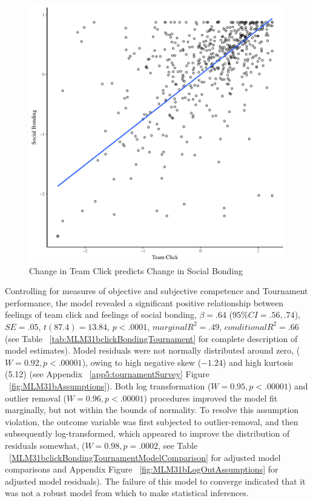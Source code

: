 \begin{landscape}
        \begin{figure}[htbp]
        \includegraphics[width = \linewidth]{images/clickBondOverallBasicXY.pdf}
          \caption{Change in Team Click predicts Change in Social Bonding}
          \label{fig:clickBondOverallBasicXY}
        \end{figure}

   Controlling for measures of objective and subjective competence and Tournament performance, the model revealed a significant positive relationship between feelings of team click and feelings of social bonding, $\beta = .64$ ($95\% CI = .56, .74$), $SE = .05$, $t(87.4) = 13.84$, $p < .0001$, $marginal R^2 = .49$, $conditional R^2 = .66$ (see Table ~\ref{tab:MLM31bclickBondingTournament} for complete description of model estimates). Model residuals were not normally distributed around zero, ($W = 0.92, p < .00001$), owing to high negative skew ($-1.24$) and high kurtosis (5.12) (see Appendix ~\ref{app5:tournamentSurvey} Figure ~\ref{fig:MLM31bAssumptions}).
   Both log transformation ($W = 0.95, p < .00001$) and outlier removal ($W = 0.96, p < .00001$) procedures improved the model fit marginally, but not within the bounds of normality.  To resolve this assumption violation, the outcome variable was first subjected to outlier-removal, and then subsequently log-transformed, which appeared to improve the distribution of residuals somewhat, ($W = 0.98, p = .0002$, see Table ~\ref{MLM31bclickBondingTournamentModelComparison} for adjusted model comparisons and Appendix Figure ~\ref{fig:MLM31bLogOutAssumptions} for adjusted model residuals).  The failure of this model to converge indicated that it was not a robust model from which to make statistical inferences.


\end{landscape}
